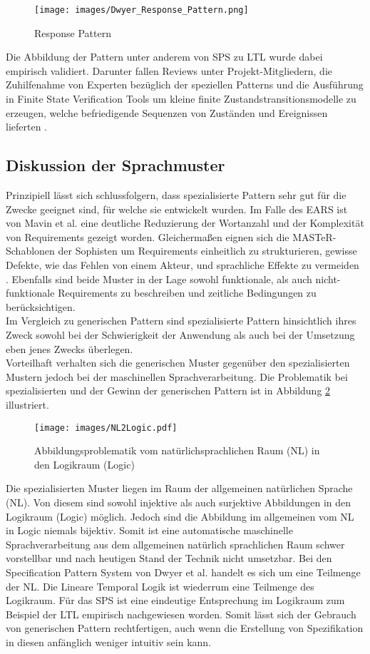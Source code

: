 \begin{figure}
	\centering
	\texttt{[image: images/Dwyer\_Response\_Pattern.png]}
	\caption{Response Pattern \cite{DAC98}}
	\label{img:Dwyer_Response_Pattern}
\end{figure}
Die Abbildung der Pattern unter anderem von SPS zu LTL wurde dabei empirisch validiert. Darunter fallen Reviews unter Projekt-Mitgliedern, die Zuhilfenahme von Experten bezüglich der speziellen Patterns und die Ausführung in Finite State Verification Tools um kleine finite Zustandstransitionsmodelle zu erzeugen, welche befriedigende Sequenzen von Zuständen und Ereignissen lieferten \cite{DACDAP17}.
\subsection{Diskussion der Sprachmuster}
\label{subsec:discPatterns}
Prinzipiell lässt sich schlussfolgern, dass spezialisierte Pattern sehr gut für die Zwecke geeignet sind, für welche sie entwickelt wurden. Im Falle des EARS ist von Mavin et al. \cite{MW10} eine deutliche Reduzierung der Wortanzahl und der Komplexität von Requirements gezeigt worden. Gleichermaßen eignen sich die MASTeR-Schablonen der Sophisten um Requirements einheitlich zu strukturieren, gewisse Defekte, wie das Fehlen von einem Akteur, und sprachliche Effekte zu vermeiden \cite{JPQRSSV16}. Ebenfalls sind beide Muster in der Lage sowohl funktionale, als auch nicht-funktionale Requirements zu beschreiben und zeitliche Bedingungen zu berücksichtigen.\\ 
Im Vergleich zu generischen Pattern sind spezialisierte Pattern hinsichtlich ihres Zweck sowohl bei der Schwierigkeit der Anwendung als auch bei der Umsetzung eben jenes Zwecks überlegen.\\
Vorteilhaft verhalten sich die generischen Muster gegenüber den spezialisierten Mustern jedoch bei der maschinellen Sprachverarbeitung. Die Problematik bei spezialisierten und der Gewinn der generischen Pattern ist in Abbildung \ref{img:NL2Logic} illustriert.\\
\begin{figure}
	\centering
	\texttt{[image: images/NL2Logic.pdf]}
	\caption{Abbildungsproblematik vom natürlichsprachlichen Raum (NL) in den Logikraum (Logic)}
	\label{img:NL2Logic}
\end{figure}
Die spezialisierten Muster liegen im Raum der allgemeinen natürlichen Sprache (NL). Von diesem sind sowohl injektive als auch surjektive Abbildungen in den Logikraum (Logic) möglich. Jedoch sind die Abbildung im allgemeinen vom NL in Logic niemals bijektiv. Somit ist eine automatische maschinelle Sprachverarbeitung aus dem allgemeinen natürlich sprachlichen Raum schwer vorstellbar und nach heutigen Stand der Technik nicht umsetzbar. Bei den Specification Pattern System von Dwyer et al. \cite{DAC98} handelt es sich um eine Teilmenge der NL. Die Lineare Temporal Logik ist wiederrum eine Teilmenge des Logikraum. Für das SPS ist eine eindeutige Entsprechung im Logikraum zum Beispiel der LTL empirisch nachgewiesen worden. Somit lässt sich der Gebrauch von generischen Pattern rechtfertigen, auch wenn die Erstellung von Spezifikation in diesen anfänglich weniger intuitiv sein kann.
